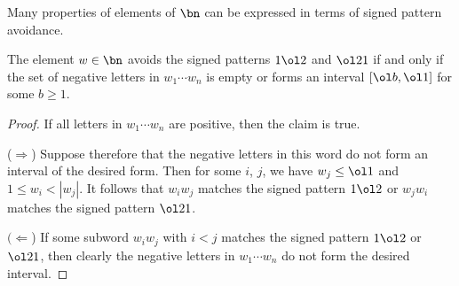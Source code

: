 Many properties of elements of $\bn$ can be expressed in terms of
signed pattern avoidance.
\begin{lem}\label{l:1ol2ol21}
  The element $w \in \bn$ avoids the signed patterns $1\ol2$ and $\ol21$
  if and only if
  the set of negative letters in $w_1 \cdots w_n$ is empty or
  forms an interval $[\ol b, \ol1]$ for some $b \geq 1$.
\end{lem}
\begin{proof}
  If all letters in $w_1 \cdots w_n$ are positive, then the claim is true.

  ($\Rightarrow$)
  Suppose therefore that the negative letters in this word do not form
  an interval of the desired form. Then for some $i$, $j$, we have
  $w_j \leq \ol1$ and $1 \leq w_i < |w_j|$.
  It follows that $w_iw_j$ matches the signed
  pattern $1\ol2$ or $w_jw_i$ matches the signed pattern $\ol2 1$.

  $(\Leftarrow$)
  If some subword $w_iw_j$ with $i < j$ matches the signed pattern
  $1 \ol2$ or $\ol21$, then clearly the negative letters in $w_1 \cdots w_n$
  do not form the desired interval.
\end{proof}

